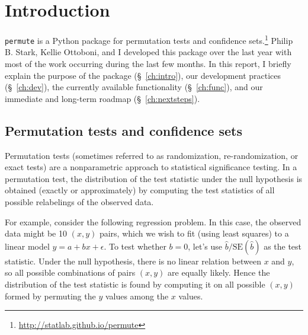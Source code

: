 \chapter{\label{ch:intro}Introduction}

\texttt{permute} is a Python package for permutation tests and confidence
sets.\footnote{\url{http://statlab.github.io/permute}}
Philip B. Stark, Kellie Ottoboni, and I developed this package over the
last year with most of the work occurring during the last few months.
In this report, I briefly explain the purpose of the package (\S~\ref{ch:intro}), our
development practices (\S~\ref{ch:dev}), the currently available functionality (\S~\ref{ch:func}), and
our immediate and long-term roadmap (\S~\ref{ch:nextsteps}).

\section{Permutation tests and confidence sets}

Permutation tests (sometimes referred to as randomization, re-randomization, or
exact tests) are a nonparametric approach to statistical significance
testing.  In a permutation test, the distribution of the test statistic under
the null hypothesis is obtained (exactly or approximately) by 
computing the test statistics of all possible relabelings of the observed data.


For example, consider the following regression problem.  In this case, the
observed data might be 10 $(x, y)$ pairs, which we wish to fit (using least
squares) to a linear model $y = a + bx + \epsilon$.  To test whether $b = 0$,
let's use $\hat{b}/\text{SE}(\hat{b})$ as the test statistic.  Under the null
hypothesis, there is no linear relation between $x$ and $y$, so all possible
combinations of pairs $(x,y)$ are equally likely.  Hence the distribution of
the test statistic is found by computing it on all possible $(x, y)$ formed by
permuting the $y$ values among the $x$ values.

